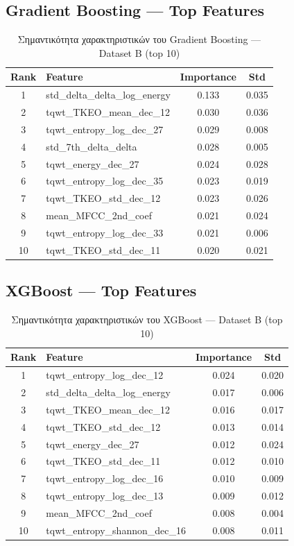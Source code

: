 \subsection{Gradient Boosting --- Top Features}

\begin{table}[H]
\centering
\begin{tabular}{@{}clcc@{}}
\toprule
\textbf{Rank} & \textbf{Feature} & \textbf{Importance} & \textbf{Std} \\
\midrule
1 & std\_delta\_delta\_log\_energy & 0.133 & 0.035 \\
2 & tqwt\_TKEO\_mean\_dec\_12 & 0.030 & 0.036 \\
3 & tqwt\_entropy\_log\_dec\_27 & 0.029 & 0.008 \\
4 & std\_7th\_delta\_delta & 0.028 & 0.005 \\
5 & tqwt\_energy\_dec\_27 & 0.024 & 0.028 \\
6 & tqwt\_entropy\_log\_dec\_35 & 0.023 & 0.019 \\
7 & tqwt\_TKEO\_std\_dec\_12 & 0.023 & 0.026 \\
8 & mean\_MFCC\_2nd\_coef & 0.021 & 0.024 \\
9 & tqwt\_entropy\_log\_dec\_33 & 0.021 & 0.006 \\
10 & tqwt\_TKEO\_std\_dec\_11 & 0.020 & 0.021 \\
\bottomrule
\end{tabular}
\caption{Σημαντικότητα χαρακτηριστικών του Gradient Boosting --- Dataset B (top 10)}
\label{tab:gb-datasetb-importance}
\end{table}

\subsection{XGBoost --- Top Features}

\begin{table}[H]
\centering
\begin{tabular}{@{}clcc@{}}
\toprule
\textbf{Rank} & \textbf{Feature} & \textbf{Importance} & \textbf{Std} \\
\midrule
1 & tqwt\_entropy\_log\_dec\_12 & 0.024 & 0.020 \\
2 & std\_delta\_delta\_log\_energy & 0.017 & 0.006 \\
3 & tqwt\_TKEO\_mean\_dec\_12 & 0.016 & 0.017 \\
4 & tqwt\_TKEO\_std\_dec\_12 & 0.013 & 0.014 \\
5 & tqwt\_energy\_dec\_27 & 0.012 & 0.024 \\
6 & tqwt\_TKEO\_std\_dec\_11 & 0.012 & 0.010 \\
7 & tqwt\_entropy\_log\_dec\_16 & 0.010 & 0.009 \\
8 & tqwt\_entropy\_log\_dec\_13 & 0.009 & 0.012 \\
9 & mean\_MFCC\_2nd\_coef & 0.008 & 0.004 \\
10 & tqwt\_entropy\_shannon\_dec\_16 & 0.008 & 0.011 \\
\bottomrule
\end{tabular}
\caption{Σημαντικότητα χαρακτηριστικών του XGBoost --- Dataset B (top 10)}
\label{tab:xgb-datasetb-importance}
\end{table}

